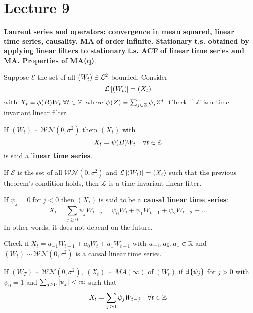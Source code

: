 \section{Lecture 9}
\label{lecture9}

\begin{center}
    \textbf{Laurent series and operators: convergence in mean squared, linear time series, causality. MA of order infinite. Stationary t.s. obtained by applying linear filters to stationary t.s. ACF of linear time series and MA. Properties of MA(q).}
\end{center}

\begin{exercise}
    Suppose $\mathcal{E}$ the set of all $(W_t)\in\mathcal{L}^{2}$ bounded. Consider
    \[
        \mathcal{L}\left[(W_t)\right]=(X_t)    
    \]
    with $X_t=\phi(B)W_t\ \forall t\in\mathbb{Z}$ where $\psi(Z)=\sum_{j\in\mathbb{Z}}\psi_jZ^j$. Check if $\mathcal{L}$ is a time invariant linear filter.
\end{exercise}

\begin{definition}
    If $(W_t)\sim\mathcal{WN}(0,\sigma^2)$ them $(X_t)$ with
    \[
        X_t=\psi(B)W_t\ \ \ \forall t\in\mathbb{Z}  
    \]
    is said a \textbf{linear time series}.
\end{definition}

\begin{remark}
    If $\mathcal{E}$ is the set of all $\mathcal{WN}(0,\sigma^2)$ and $\mathcal{L}\left[(W_t)\right]=(X_t)$ such that the previous theorem's condition holds, then $\mathcal{L}$ is a time-invariant linear filter.
\end{remark}

\begin{definition}
    If $\psi_j=0$ for $j<0$ then $(X_t)$ is said to be a \textbf{causal linear time series}:
    \[
        X_t=\sum_{j\ge0}\psi_jW_{t-j}=\psi_0W_t+\psi_1W_{t-1}+\psi_2W_{t-2}+...  
    \]
    In other words, it does not depend on the future.
\end{definition}

\begin{exercise}
    Check if $X_t=a_{-1}W_{t+1}+a_0W_t+a_1W_{t-1}$ with $a_{-1},a_0,a_1\in\mathbb{R}$ and $(W_t)\sim\mathcal{WN}(0,\sigma^2)$ is a causal linear time series.
\end{exercise}

\begin{definition}
    If $(W_T)\sim\mathcal{WN}(0,\sigma^2),\ (X_t)\sim MA(\infty)$ of $(W_t)$ if $\exists\left\{\psi_j\right\}$ for $j>0$ with $\psi_0=1$ and $\sum_{j\ge0}\left|\psi_j\right|<\infty$ such that
    \[
        X_t=\sum_{j\ge0}\psi_jW_{t-j}\ \ \ \forall t\in\Z  
    \]
\end{definition}

